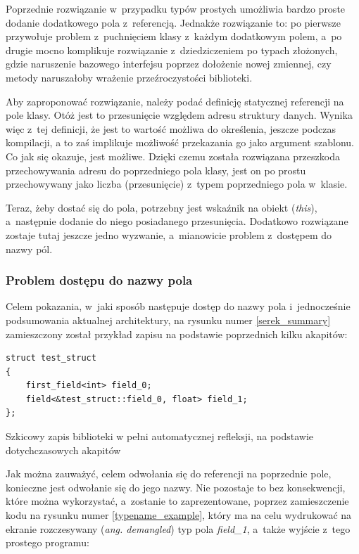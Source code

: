 \documentclass[12pt]{article}
\newcommand{\n}{\newline}
\newcommand{\nonpl}[1]{{\it #1}}
\newcommand{\code}[1]{{\it #1}}
\newcommand{\ang}[1]{\nonpl{ang. #1}}
\begin{document}
{{{				Poprzednie rozwiązanie w~przypadku typów prostych umożliwia bardzo proste dodanie dodatkowego pola z~referencją. Jednakże rozwiązanie to:
				po pierwsze przywołuje problem z~puchnięciem klasy z~każdym dodatkowym polem, a~po drugie mocno komplikuje rozwiązanie z~dziedziczeniem po
				typach złożonych, gdzie naruszenie bazowego interfejsu poprzez dołożenie nowej zmiennej, czy metody naruszałoby wrażenie przeźroczystości
				biblioteki.\n

				Aby zaproponować rozwiązanie, należy podać definicję statycznej referencji na pole klasy. Otóż jest to przesunięcie względem
				adresu struktury danych. Wynika więc z~tej definicji, że jest to wartość możliwa do określenia, jeszcze podczas kompilacji,
				a to zaś implikuje możliwość przekazania go jako argument szablonu. Co jak się okazuje, jest możliwe. Dzięki czemu została rozwiązana przeszkoda
				przechowywania adresu do poprzedniego pola klasy, jest on po prostu przechowywany jako liczba (przesunięcie) z~typem poprzedniego pola w~klasie.\n

				Teraz, żeby dostać się do pola, potrzebny jest wskaźnik na obiekt (\code{this}), a~następnie dodanie do niego posiadanego przesunięcia.
				Dodatkowo rozwiązane zostaje tutaj jeszcze jedno wyzwanie, a~mianowicie problem z~dostępem do nazwy pól.
			}

			{
				\subsubsection{Problem dostępu do nazwy pola}

				Celem pokazania, w~jaki sposób następuje dostęp do nazwy pola i~jednocześnie podsumowania aktualnej architektury, na rysunku numer \ref{serek_summary} zamieszczony
				został przykład zapisu na podstawie poprzednich kilku akapitów:\n

				\begin{captioned}[H]
					\begin{lstlisting}[frame=single]
struct test_struct
{
	first_field<int> field_0;
	field<&test_struct::field_0, float> field_1;
};
					\end{lstlisting}
					\caption{ Szkicowy zapis biblioteki w pełni automatycznej refleksji, na podstawie dotychczasowych akapitów}
					\label{serek_summary}
				\end{captioned}


				Jak można zauważyć, celem odwołania się do referencji na poprzednie pole, konieczne jest odwołanie się do jego nazwy. Nie pozostaje to bez
				konsekwencji, które można wykorzystać, a~zostanie to zaprezentowane, poprzez zamieszczenie kodu na rysunku numer \ref{typename_example}, który
				ma na celu wydrukować na ekranie rozczesywany (\ang{demangled}) typ pola \code{field\_1}, a~także wyjście z~tego prostego programu:\n

}}}
\end{document}
